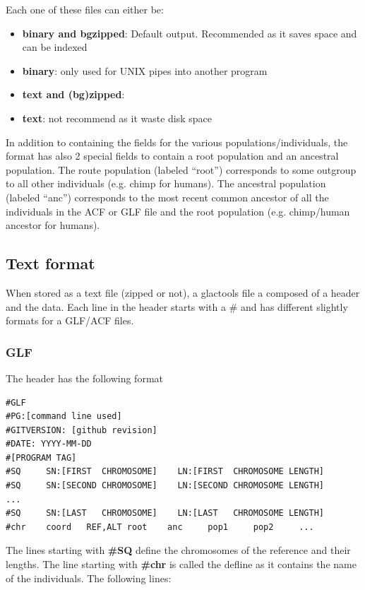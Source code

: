 \documentclass[a4paper]{article}
\begin{document}
\noindent  Each one of these files can either be:
\begin{itemize}
\item {\bf binary and bgzipped}: Default output. Recommended as it saves space and can be indexed
\item {\bf binary}:  only used for UNIX pipes into another program
\item {\bf text and (bg)zipped}: 
\item {\bf text}: not recommend as it waste disk space
\end{itemize}

\noindent In addition to containing the fields for the various populations/individuals, the format  has also 2 special fields to contain a root population and an ancestral population.  The route population (labeled  ``root'') corresponds to some outgroup to all other individuals (e.g. chimp for humans).  The ancestral population (labeled  ``anc'')  corresponds to the most recent common ancestor of all the individuals in the ACF or GLF file and the root population (e.g. chimp/human ancestor for humans).
\subsection{Text format}


When stored as a text file (zipped or not), a glactools file a composed of a header and the data. Each line in the header starts with a \# and has different slightly formats for a GLF/ACF files.

\subsubsection{GLF} 
\label{text:glf}
\noindent The header has the following format

\begin{lstlisting}
#GLF
#PG:[command line used]
#GITVERSION: [github revision]
#DATE: YYYY-MM-DD
#[PROGRAM TAG]
#SQ     SN:[FIRST  CHROMOSOME]    LN:[FIRST  CHROMOSOME LENGTH]
#SQ     SN:[SECOND CHROMOSOME]    LN:[SECOND CHROMOSOME LENGTH]
...
#SQ     SN:[LAST   CHROMOSOME]    LN:[LAST   CHROMOSOME LENGTH]
#chr    coord   REF,ALT root    anc     pop1     pop2     ...
\end{lstlisting}


\noindent The lines starting with {\bf \#SQ} define the chromosomes of the reference and their lengths. The line starting with {\bf \#chr} is called the defline as it contains the name of the individuals. The following lines:
\end{document}
